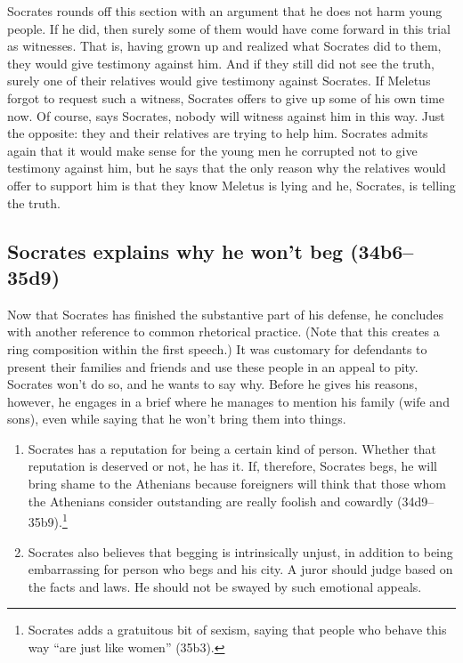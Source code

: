 \documentclass[11pt]{article}
\begin{document}
Socrates rounds off this section with an argument that he does not harm young people.  If he did, then surely some of them would have come forward in this trial as witnesses.  That is, having grown up and realized what Socrates did to them, they would give testimony against him.  And if they still did not see the truth, surely one of their relatives would give testimony against Socrates.  If Meletus forgot to request such a witness, Socrates offers to give up some of his own time now.  Of course, says Socrates, nobody will witness against him in this way.  Just the opposite: they and their relatives are trying to help him.  Socrates admits again that it would make sense for the young men he corrupted not to give testimony against him, but he says that the only reason why the relatives would offer to support him is that they know Meletus is lying and he, Socrates, is telling the truth.


\subsection{Socrates explains why he won't beg (34b6--35d9)}

Now that Socrates has finished the substantive part of his defense, he concludes with another reference to common rhetorical practice.  (Note that this creates a ring composition within the first speech.)  It was customary for defendants to present their families and friends and use these people in an appeal to pity.  Socrates won't do so, and he wants to say why.  Before he gives his reasons, however, he engages in a brief  where he manages to mention his family (wife and sons), even while saying that he won't bring them into things.

\begin{enumerate}

    \item Socrates has a reputation for being a certain kind of person.  Whether that reputation is deserved or not, he has it. If, therefore, Socrates begs, he will bring shame to the Athenians because foreigners will think that those whom the Athenians consider outstanding are really foolish and cowardly (34d9--35b9).\footnote{Socrates adds a gratuitous bit of sexism, saying that people who behave this way ``are just like women'' (35b3).}

    \item Socrates also believes that begging is intrinsically unjust, in addition to being embarrassing for person who begs and his city.  A juror should judge based on the facts and laws.  He should not be swayed by such emotional appeals.

\end{enumerate}
\end{document}
